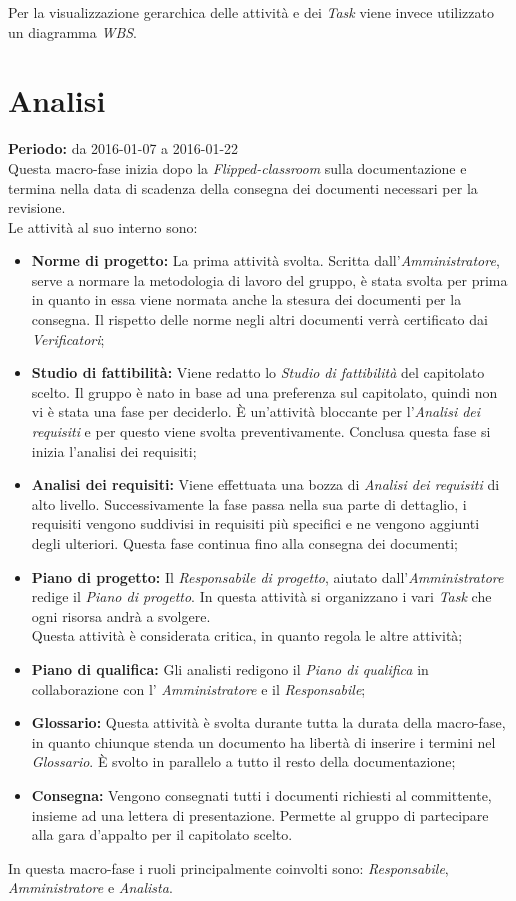 \documentclass[a4paper]{report}
\begin{document}
		Per la visualizzazione gerarchica delle attività e dei \emph{Task} viene invece utilizzato un diagramma \emph{WBS}.
		\section{Analisi}
			\textbf{Periodo:} da 2016-01-07 a 2016-01-22 \\
			Questa macro-fase inizia dopo la \emph{Flipped-classroom} sulla documentazione e termina nella data
			di scadenza della consegna dei documenti necessari per la revisione.\\ Le attività al suo interno sono:
			\begin{itemize}
				\item \textbf{Norme di progetto:} La prima attività svolta. Scritta dall'\emph{Amministratore}, serve a normare
				la metodologia di lavoro del gruppo, è stata svolta per prima in quanto in essa viene normata anche la stesura
				dei documenti per la consegna. Il rispetto delle norme negli altri documenti verrà certificato dai \emph{Verificatori}; 
				\item \textbf{Studio di fattibilità:} Viene redatto lo \emph{Studio di fattibilità} del capitolato scelto. Il gruppo è
				nato in base ad una preferenza sul capitolato, quindi non vi è stata una fase per deciderlo. È un'attività bloccante per
				l'\emph{Analisi dei requisiti} e per questo viene svolta preventivamente. Conclusa questa fase si inizia l'analisi dei 
				requisiti;
				\item \textbf{Analisi dei requisiti:} Viene effettuata una bozza di \emph{Analisi dei requisiti} di alto livello. 
				Successivamente la fase passa nella sua parte di dettaglio, i requisiti vengono suddivisi in requisiti più specifici e 
				ne vengono aggiunti degli ulteriori. Questa fase continua fino alla consegna dei documenti;
				\item \textbf{Piano di progetto:} Il \emph{Responsabile di progetto}, aiutato dall'\emph{Amministratore} redige il 
				\emph{Piano di progetto}. In questa attività si organizzano i vari \emph{Task} che ogni risorsa andrà a svolgere.\\
				Questa attività è considerata critica, in quanto regola le altre attività;
				\item \textbf{Piano di qualifica:} Gli analisti redigono il \emph{Piano di qualifica} in collaborazione con l'
				\emph{Amministratore} e il \emph{Responsabile};
				\item \textbf{Glossario:} Questa attività è svolta durante tutta la durata della macro-fase, in quanto chiunque
				stenda un documento ha libertà di inserire i termini nel \emph{Glossario}. È svolto in parallelo a tutto il resto 
				della documentazione;
				\item \textbf{Consegna:} Vengono consegnati tutti i documenti richiesti al committente, insieme ad una lettera di 
				presentazione. Permette al gruppo di partecipare alla gara d'appalto per il capitolato scelto.
			\end{itemize}
			In questa macro-fase i ruoli principalmente coinvolti sono: \emph{Responsabile}, \emph{Amministratore} e \emph{Analista}.
\end{document}
